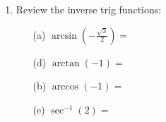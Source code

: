 \documentclass[letterpaper,11pt]{article}
\newif\ifsolutions
\begin{document}
\begin{enumerate}
\begin{changemargin}{0cm}{0cm}
\begin{multicols}{3}
\begin{enumerate}
\item[(d)] $\displaystyle \sin{\left(-\frac{\pi}{6} \right)}=$
\ifsolutions \textcolor{blue}{$\displaystyle-\frac{1}{2}$} \fi
\vspace{.25in}

\item[(b)] $\displaystyle \cos{\left( \frac{5\pi}{4} \right)}=$
\ifsolutions \textcolor{blue}{$\displaystyle -\frac{\sqrt{2}}{2}$} \fi
\vspace{.25in}

\item[(e)] $\displaystyle \sec{\left( \frac{5\pi}{3} \right)}=$
\ifsolutions \textcolor{blue}{$2$} \fi
\vspace{.25in}

\item[(c)] $\displaystyle \tan{\left(\frac{7\pi}{6} \right)}=$
\ifsolutions \textcolor{blue}{$\displaystyle \frac{\sqrt{3}}{3}$} \fi
\vspace{.25in}

\item[(f)] $\displaystyle \tan{\left(-\frac{3\pi}{2}\right)}=$
\ifsolutions \textcolor{blue}{undefined} \fi
\vspace{.25in}

\end{enumerate}
\end{multicols}
\end{changemargin}

\item  Review the inverse trig functions:
\begin{changemargin}{0cm}{0cm}
\begin{multicols}{3}
\begin{enumerate}

\item[(a)] $\displaystyle \arcsin{\left(-\frac{\sqrt{3}}{2}\right)}=$
\ifsolutions \textcolor{blue}{$-\frac{\pi}{3}$} \fi
\vspace{.25in}

\item[(d)] $\displaystyle \arctan{(-1)}=$
\ifsolutions \textcolor{blue}{$-\frac{\pi}{4}$} \fi
\vspace{.25in}

\item[(b)] $\displaystyle \arccos{(-1)}=$
\ifsolutions \textcolor{blue}{$\pi$} \fi
\vspace{.25in}

\item[(e)] $\displaystyle \sec^{-1}{(2)}=$
\ifsolutions \textcolor{blue}{$\frac{\pi}{3}$} \fi
\vspace{.25in}


\end{enumerate}
\end{multicols}
\end{changemargin}
\end{enumerate}
\end{document}

